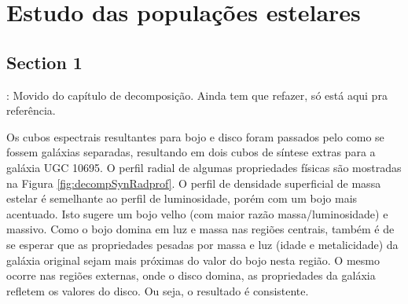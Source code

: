 


\chapter{Estudo das populações estelares}
\label{sec:pop}


\section{Section 1}

\TODO: Movido do capítulo de decomposição. Ainda tem que refazer, só
está aqui pra referência.

Os cubos espectrais resultantes para bojo e disco foram passados pelo \starlight
como se fossem galáxias separadas, resultando em dois cubos de síntese extras
para a galáxia UGC 10695. O perfil radial de algumas propriedades físicas são
mostradas na Figura \ref{fig:decompSynRadprof}. O perfil de densidade
superficial de massa estelar é semelhante ao perfil de luminosidade, porém com
um bojo mais acentuado. Isto sugere um bojo velho (com maior razão
massa/luminosidade) e massivo. Como o bojo domina em luz e massa nas regiões
centrais, também é de se esperar que as propriedades pesadas por massa e luz
(idade e metalicidade) da galáxia original sejam mais próximas do valor do bojo
nesta região. O mesmo ocorre nas regiões externas, onde o disco domina, as
propriedades da galáxia refletem os valores do disco. Ou seja, o resultado é
consistente.

